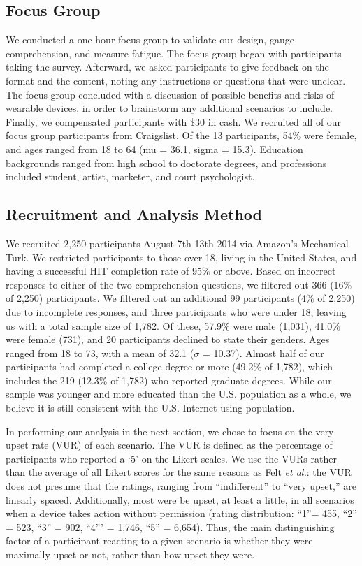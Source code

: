 \subsection{Focus Group}
We conducted a one-hour focus group to validate our design, gauge comprehension, and measure fatigue. The focus group began with participants taking the survey. Afterward, we asked participants to give feedback on the format and the content, noting any instructions or questions that were unclear. The focus group concluded with a discussion of possible benefits and risks of wearable devices, in order to brainstorm any additional scenarios to include. Finally, we compensated participants with \$30 in cash. We recruited all of our focus group participants from Craigslist. Of the 13 participants, 54\% were female, and ages ranged from 18 to 64 (mu = 36.1, sigma = 15.3).  Education backgrounds ranged from high school to doctorate degrees, and professions included student, artist, marketer, and court psychologist.

\subsection{Recruitment and Analysis Method}
We recruited 2,250 participants August 7th-13th 2014 via Amazon's Mechanical Turk. We restricted participants to those over 18, living in the United States, and having a successful HIT completion rate of 95\% or above. Based on incorrect responses to either of the two comprehension questions, we filtered out 366 (16\% of 2,250) participants. We filtered out an additional 99 participants (4\% of 2,250) due to incomplete responses, and three participants who were under 18, leaving us with a total sample size of 1,782. Of these, 57.9\% were male (1,031), 41.0\% were female (731), and 20 participants declined to state their genders. Ages ranged from 18 to 73, with a mean of 32.1 ($\sigma$ = 10.37). Almost half of our participants had completed a college degree or more (49.2\% of 1,782), which includes the 219 (12.3\% of 1,782) who reported graduate degrees. While our sample was younger and more educated than the U.S. population as a whole, we believe it is still consistent with the U.S. Internet-using population.

In performing our analysis in the next section, we chose to focus on the very upset rate (VUR) of each scenario.  The VUR is defined as the percentage of participants who reported a `5' on the Likert scales. 
We use the VURs rather than the average of all Likert scores for the same reasons as Felt {\it et al.}: the VUR does not presume that the ratings, ranging from ``indifferent'' to ``very upset,'' are linearly spaced. Additionally, most were be upset, at least a little, in all scenarios when a device takes action without permission (rating distribution: ``1''= 455, ``2'' = 523, ``3'' = 902, ``4''' = 1,746, ``5'' = 6,654). Thus, the main distinguishing factor of a participant reacting to a given scenario is whether they were maximally upset or not, rather than how upset they were.

